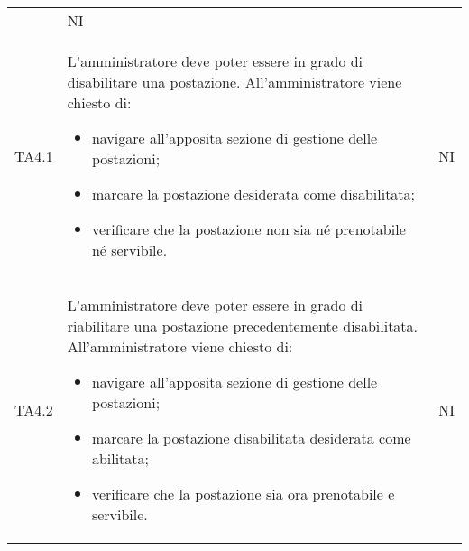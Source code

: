 {\begin{longtable}{ c C{11cm} c }
\begin{itemize}
        \end{itemize}&
        NI\\
        TA4.1&
        L'amministratore deve poter essere in grado di disabilitare una postazione.\newline
        All'amministratore viene chiesto di:
        \begin{itemize}
            \item navigare all'apposita sezione di gestione delle postazioni;
            \item marcare la postazione desiderata come disabilitata;
            \item verificare che la postazione non sia né prenotabile né servibile.
        \end{itemize}&
        NI\\
        TA4.2&
        L'amministratore deve poter essere in grado di riabilitare una postazione precedentemente disabilitata.\newline
        All'amministratore viene chiesto di:
        \begin{itemize}
            \item navigare all'apposita sezione di gestione delle postazioni;
            \item marcare la postazione disabilitata desiderata come abilitata;
            \item verificare che la postazione sia ora prenotabile e servibile.
        \end{itemize}&
        NI\\
       
        
    \end{longtable}
}